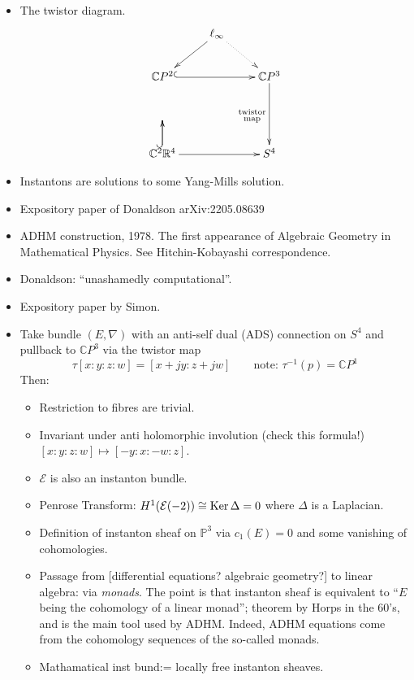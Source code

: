 \begin{itemize}
\item The twistor diagram.
$$
\xymatrix{
&  \ell_\infty \ar@{.>}[dr]\ar[dl]\\
\mathbb{C}P^{2} \ar@{^{(}->}[rr]& &
\mathbb{C}P^{3}\ar[dd]_{\substack{\text{twistor} \\ \text{map}}}\\ \\
\mathbb{C}^2\ar@{^{(}->}[u]
\mathbb{R}^4 \ar[u]\ar[rr]& &S^4
}
$$
\item Instantons are solutions to some Yang-Mills solution.
\item Expository paper of Donaldson arXiv:2205.08639
\item ADHM construction, 1978. The first appearance of Algebraic Geometry in
Mathematical Physics. See Hitchin-Kobayashi correspondence.
\item Donaldson: ``unashamedly computational''.
\item Expository paper by Simon.
\item Take bundle $(E,\nabla)$ with an anti-self dual (ADS) 
connection on $S^4$ and pullback to $\mathbb{C}P^{3}$ via the
twistor map
$$
\tau[x:y:z:w]=[x+jy:z+jw] \qquad \text{note: $\tau^{-1}(p)=\mathbb{C}P^{1}$}
$$
Then:
\begin{itemize}
\item Restriction to fibres are trivial.
\item Invariant under anti holomorphic involution (check this formula!) 
$[x:y:z:w] \mapsto [-y:x:-w:z]$.
\item $\mathcal{E}$ is also an instanton bundle.
\item Penrose Transform: $H^1(\mathcal{E}(-2)) \cong \mathop{\mathrm{Ker}} \Delta=0$ where
$\Delta$ is a Laplacian.
\item Definition of instanton sheaf on $\mathbb{P}^3$ via $c_1(E)=0$ and some
vanishing of cohomologies.
\item Passage from [differential equations? algebraic geometry?] 
to linear algebra: via {\it monads}. The point is that instanton sheaf is
equivalent to  ``$E$ being the cohomology of a linear monad''; theorem by Horps
in the 60's, and is the main tool used by ADHM. Indeed, ADHM equations come from
the cohomology sequences of the so-called monads.
\item Mathamatical inst bund:= locally free instanton sheaves.
\end{itemize}
\end{itemize}

